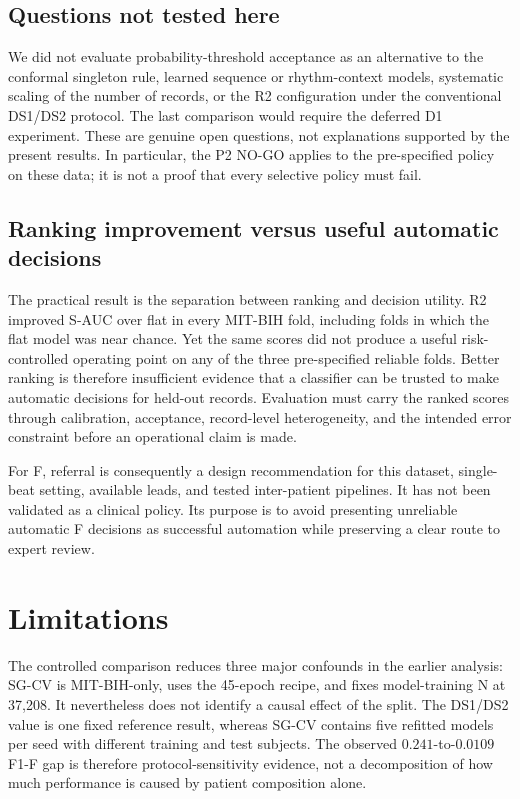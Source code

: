 \documentclass[pdflatex,sn-mathphys-num]{sn-jnl}
\begin{document}
\subsection{Questions not tested here}
We did not evaluate probability-threshold acceptance as an alternative to the
conformal singleton rule, learned sequence or rhythm-context models, systematic
scaling of the number of records, or the R2 configuration under the conventional
DS1/DS2 protocol. The last comparison would require the deferred D1 experiment.
These are genuine open questions, not explanations supported by the present
results. In particular, the P2 NO-GO applies to the pre-specified policy on
these data; it is not a proof that every selective policy must fail.

\subsection{Ranking improvement versus useful automatic decisions}
The practical result is the separation between ranking and decision utility.
R2 improved S-AUC over flat in every MIT-BIH fold, including folds in which the
flat model was near chance. Yet the same scores did not produce a useful
risk-controlled operating point on any of the three pre-specified reliable
folds. Better ranking is therefore insufficient evidence that a classifier can
be trusted to make automatic decisions for held-out records. Evaluation must
carry the ranked scores through calibration, acceptance, record-level
heterogeneity, and the intended error constraint before an operational claim is
made.

For F, referral is consequently a design recommendation for this dataset,
single-beat setting, available leads, and tested inter-patient pipelines. It
has not been validated as a clinical policy. Its purpose is to avoid
presenting unreliable automatic F decisions as successful automation
while preserving a clear route to expert review.

\section{Limitations}
The controlled comparison reduces three major confounds in the earlier analysis:
SG-CV is MIT-BIH-only, uses the 45-epoch recipe, and fixes model-training N at
37,208. It nevertheless does not identify a causal effect of the split. The
DS1/DS2 value is one fixed reference result, whereas SG-CV contains five refitted
models per seed with different training and test subjects. The observed
$0.241$-to-$0.0109$ F1-F gap is therefore protocol-sensitivity evidence, not a
decomposition of how much performance is caused by patient composition alone.
\end{document}
